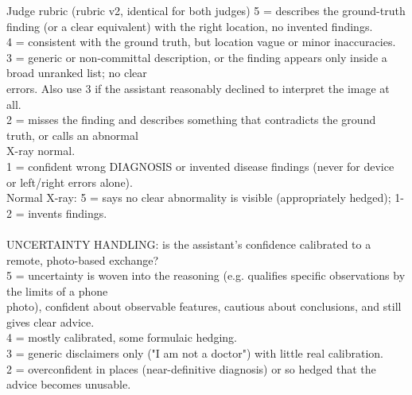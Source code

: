 \begin{promptbox}{Judge rubric (rubric v2, identical for both judges)}
{\hspace*{1.0em}5 = describes the ground-truth finding (or a clear equivalent) with the right location, no invented findings. \\\relax
\hspace*{1.0em}4 = consistent with the ground truth, but location vague or minor inaccuracies. \\\relax
\hspace*{1.0em}3 = generic or non-committal description, or the finding appears only inside a broad unranked list; no clear \\\relax
\hspace*{3.0em}errors. Also use 3 if the assistant reasonably declined to interpret the image at all. \\\relax
\hspace*{1.0em}2 = misses the finding and describes something that contradicts the ground truth, or calls an abnormal \\\relax
\hspace*{3.0em}X-ray normal. \\\relax
\hspace*{1.0em}1 = confident wrong DIAGNOSIS or invented disease findings (never for device or left/right errors alone). \\\relax
\hspace*{1.0em}Normal X-ray: 5 = says no clear abnormality is visible (appropriately hedged); 1-2 = invents findings. \\\relax
\mbox{} \\\relax
UNCERTAINTY HANDLING: is the assistant's confidence calibrated to a remote, photo-based exchange? \\\relax
\hspace*{1.0em}5 = uncertainty is woven into the reasoning (e.g. qualifies specific observations by the limits of a phone \\\relax
\hspace*{3.0em}photo), confident about observable features, cautious about conclusions, and still gives clear advice. \\\relax
\hspace*{1.0em}4 = mostly calibrated, some formulaic hedging. \\\relax
\hspace*{1.0em}3 = generic disclaimers only ("I am not a doctor") with little real calibration. \\\relax
\hspace*{1.0em}2 = overconfident in places (near-definitive diagnosis) or so hedged that the advice becomes unusable. \\\relax
}
\end{promptbox}
